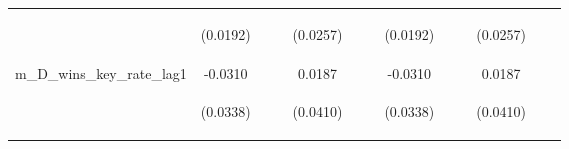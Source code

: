 \documentclass[]{article}
\begin{document}
\begin{center}
\begin{tabular}{lcccccccccccc}
\vspace{4pt} & \begin{footnotesize}(0.0192)\end{footnotesize} & \begin{footnotesize}\end{footnotesize} & \begin{footnotesize}\end{footnotesize} & \begin{footnotesize}(0.0257)\end{footnotesize} & \begin{footnotesize}\end{footnotesize} & \begin{footnotesize}\end{footnotesize} & \begin{footnotesize}(0.0192)\end{footnotesize} & \begin{footnotesize}\end{footnotesize} & \begin{footnotesize}\end{footnotesize} & \begin{footnotesize}(0.0257)\end{footnotesize} & \begin{footnotesize}\end{footnotesize} & \begin{footnotesize}\end{footnotesize} \\
m\_D\_wins\_key\_rate\_lag1 & -0.0310 &  &  & 0.0187 &  &  & -0.0310 &  &  & 0.0187 &  &  \\
\vspace{4pt} & \begin{footnotesize}(0.0338)\end{footnotesize} & \begin{footnotesize}\end{footnotesize} & \begin{footnotesize}\end{footnotesize} & \begin{footnotesize}(0.0410)\end{footnotesize} & \begin{footnotesize}\end{footnotesize} & \begin{footnotesize}\end{footnotesize} & \begin{footnotesize}(0.0338)\end{footnotesize} & \begin{footnotesize}\end{footnotesize} & \begin{footnotesize}\end{footnotesize} & \begin{footnotesize}(0.0410)\end{footnotesize} & \begin{footnotesize}\end{footnotesize} & \begin{footnotesize}\end{footnotesize} \\

\end{tabular}
\end{center}
\end{document}
